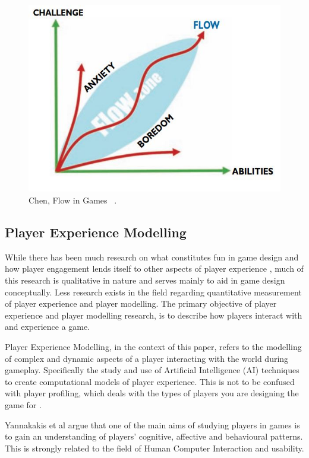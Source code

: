 \documentclass[journal]{IEEEtran}
\begin{document}
\begin{figure}[h]
	\includegraphics[width=1.0\linewidth]{FlowChart.jpg}
	\caption{Chen, Flow in Games ~\cite{Chen:2007:FG:1232743.1232769}.}
	\label{fig::1}
\end{figure} 


\subsection{Player Experience Modelling}

While there has been much research on what constitutes fun in game design and how player engagement lends itself to other aspects of player experience \cite{salen2004rules} \cite{koster2013theory}, much of this research is qualitative in nature and serves mainly to aid in game design conceptually. Less research exists in the field regarding quantitative measurement of player experience and player modelling. The primary objective of player experience and player modelling research, is to describe how players interact with and experience a game. 

Player Experience Modelling, in the context of this paper, refers to the modelling of complex and dynamic aspects of a player interacting with the world during gameplay. Specifically the study and use of Artificial Intelligence (AI) techniques to create computational models of player experience. This is not to be confused with player profiling, which deals with the types of players you are designing the game for \cite{bartle1996hearts}. 

Yannakakis et al \cite{yannakakis2013player} argue that one of the main aims of studying players in games is to gain an understanding of players' cognitive, affective and behavioural patterns. This is strongly related to the field of Human Computer Interaction \cite{preece1994human} \cite{fischer2001user} and usability. 
\end{document}
